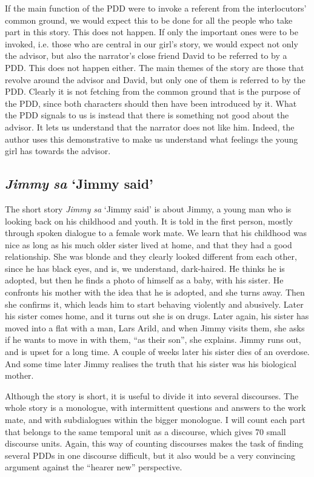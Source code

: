 \documentclass[output=paper,colorlinks,citecolor=brown]{langscibook}
\begin{document}
If the main function of the PDD were to invoke a referent from the interlocutors’ common ground, we would expect this to be done for all the people who take part in this story. This does not happen. If only the important ones were to be invoked, i.e. those who are central in our girl’s story, we would expect not only the advisor, but also the narrator’s close friend David to be referred to by a PDD. This does not happen either. The main themes of the story are those that revolve around the advisor and David, but only one of them is referred to by the PDD. Clearly it is not fetching from the common ground that is the purpose of the PDD, since both characters should then have been introduced by it. What the PDD signals to us is instead that there is something not good about the advisor. It lets us understand that the narrator does not like him. Indeed, the author uses this demonstrative to make us understand what feelings the young girl has towards the advisor. 

\subsection{ \textit{Jimmy} \textit{sa} ‘Jimmy said’}\label{sec:johannessen:4.2}

The short story \textit{Jimmy} \textit{sa} ‘Jimmy said’ \citep[51-77]{Rishoi2014} is about Jimmy, a young man who is looking back on his childhood and youth. It is told in the first person, mostly through spoken dialogue to a female work mate. We learn that his childhood was nice as long as his much older sister lived at home, and that they had a good relationship. She was blonde and they clearly looked different from each other, since he has black eyes, and is, we understand, dark-haired. He thinks he is adopted, but then he finds a photo of himself as a baby, with his sister. He confronts his mother with the idea that he is adopted, and she turns away. Then she confirms it, which leads him to start behaving violently and abusively. Later his sister comes home, and it turns out she is on drugs. Later again, his sister has moved into a flat with a man, Lars Arild, and when Jimmy visits them, she asks if he wants to move in with them, “as their son”, she explains. Jimmy runs out, and is upset for a long time. A couple of weeks later his sister dies of an overdose. And some time later Jimmy realises the truth that his sister was his biological mother. 

Although the story is short, it is useful to divide it into several discourses. The whole story is a monologue, with intermittent questions and answers to the work mate, and with subdialogues within the bigger monologue. I will count each part that belongs to the same temporal unit as a discourse, which gives 70 small discourse units. Again, this way of counting discourses makes the task of finding several PDDs in one discourse difficult, but it also would be a very convincing argument against the “hearer new” perspective.
\end{document}
